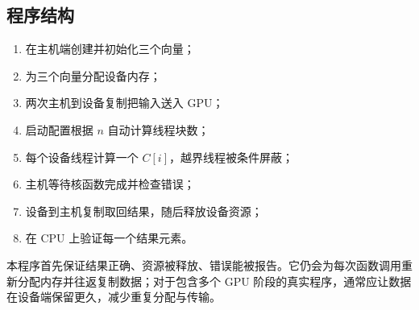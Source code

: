 \subsection{程序结构}

\begin{enumerate}
  \item {} 在主机端创建并初始化三个向量；
  \item {} 为三个向量分配设备内存；
  \item 两次主机到设备复制把输入送入 GPU；
  \item 启动配置根据 $n$ 自动计算线程块数；
  \item 每个设备线程计算一个 $C[i]$，越界线程被条件屏蔽；
  \item 主机等待核函数完成并检查错误；
  \item 设备到主机复制取回结果，随后释放设备资源；
  \item {} 在 CPU 上验证每一个结果元素。
\end{enumerate}

\begin{keybox}[title={正确性与性能是两个层次}]
本程序首先保证结果正确、资源被释放、错误能被报告。它仍会为每次函数调用重新分配内存并往返复制数据；对于包含多个 GPU 阶段的真实程序，通常应让数据在设备端保留更久，减少重复分配与传输。
\end{keybox}
